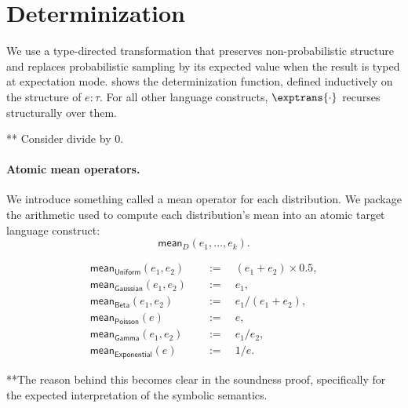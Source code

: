 \section{Determinization}
We use a type-directed transformation that preserves non-probabilistic structure and replaces probabilistic sampling by its expected value when the result is typed at expectation mode.  shows the determinization function, defined inductively on the structure of $e : \tau$. For all other language constructs, $\exptrans{\cdot}$ recurses structurally over them.

** Consider divide by 0.

\paragraph{Atomic mean operators.}
We introduce something called a mean operator for each distribution. We package the arithmetic used to compute each distribution's mean into an atomic target language construct:
\[
  \mathsf{mean}_D(e_1,\ldots,e_k).
\]


\[
\begin{aligned}
  \mathsf{mean}_{\mathsf{Uniform}}(e_1,e_2)
  &\quad := \quad
  (e_1+e_2)\times 0.5,
  \\
  \mathsf{mean}_{\mathsf{Gaussian}}(e_1,e_2)
  &\quad := \quad
  e_1,
  \\
  \mathsf{mean}_{\mathsf{Beta}}(e_1,e_2)
  &\quad := \quad
  e_1/(e_1+e_2),
  \\
  \mathsf{mean}_{\mathsf{Poisson}}(e)
  &\quad := \quad
  e,
  \\
  \mathsf{mean}_{\mathsf{Gamma}}(e_1,e_2)
  &\quad := \quad
  e_1/e_2,
  \\
  \mathsf{mean}_{\mathsf{Exponential}}(e)
  &\quad := \quad
  1/e.
\end{aligned}
\]

**The reason behind this becomes clear in the soundness proof, specifically for the expected interpretation of the symbolic semantics.

